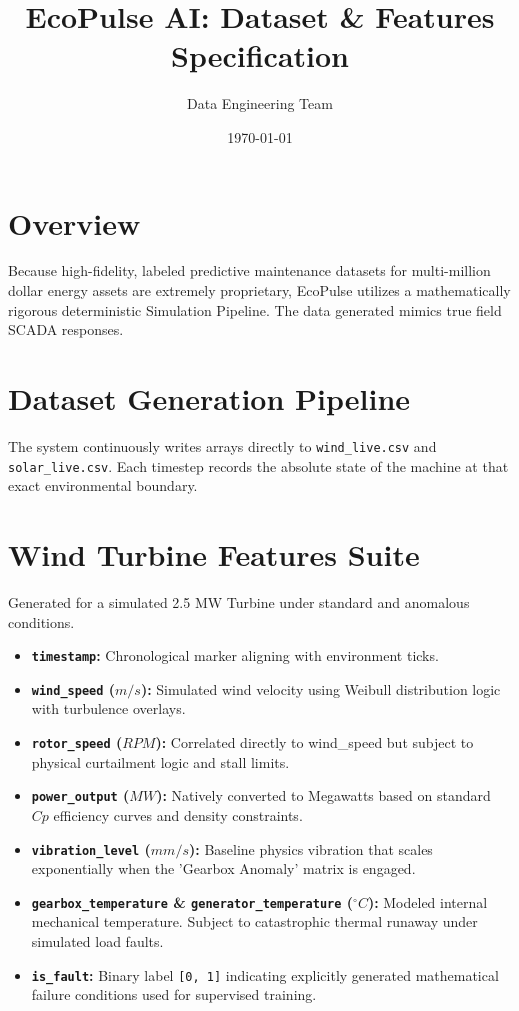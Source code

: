 \documentclass[11pt, a4paper]{article}
\title{\textbf{EcoPulse AI: Dataset \& Features Specification}}
\author{Data Engineering Team}
\date{\today}
\begin{document}
\maketitle

\section{Overview}
Because high-fidelity, labeled predictive maintenance datasets for multi-million dollar energy assets are extremely proprietary, EcoPulse utilizes a mathematically rigorous deterministic Simulation Pipeline. The data generated mimics true field SCADA responses.

\section{Dataset Generation Pipeline}
The system continuously writes arrays directly to \texttt{wind\_live.csv} and \texttt{solar\_live.csv}. Each timestep records the absolute state of the machine at that exact environmental boundary. 

\section{Wind Turbine Features Suite}
Generated for a simulated 2.5 MW Turbine under standard and anomalous conditions.
\begin{itemize}
    \item \textbf{\texttt{timestamp}:} Chronological marker aligning with environment ticks.
    \item \textbf{\texttt{wind\_speed} ($m/s$):} Simulated wind velocity using Weibull distribution logic with turbulence overlays.
    \item \textbf{\texttt{rotor\_speed} ($RPM$):} Correlated directly to wind\_speed but subject to physical curtailment logic and stall limits.
    \item \textbf{\texttt{power\_output} ($MW$):} Natively converted to Megawatts based on standard $Cp$ efficiency curves and density constraints.
    \item \textbf{\texttt{vibration\_level} ($mm/s$):} Baseline physics vibration that scales exponentially when the 'Gearbox Anomaly' matrix is engaged.
    \item \textbf{\texttt{gearbox\_temperature} \& \textbf{\texttt{generator\_temperature}} ($^{\circ}C$):} Modeled internal mechanical temperature. Subject to catastrophic thermal runaway under simulated load faults.
    \item \textbf{\texttt{is\_fault}:} Binary label \texttt{[0, 1]} indicating explicitly generated mathematical failure conditions used for supervised training. 
\end{itemize}
\end{document}
